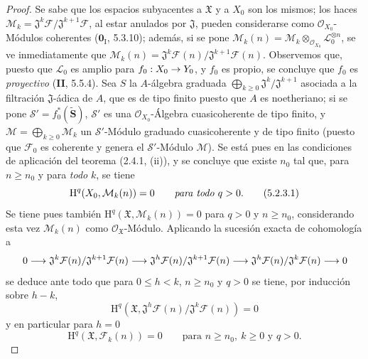 \documentclass[10pt,oneside,openany]{book}
\theoremstyle{egaenv}\newtheorem*{env}{---}
\theoremstyle{egastatement}
\theoremstyle{egadescription}
\newcommand{\oldpage}[2][]{\marginnote{\normalfont\scriptsize\textbf{#1}\,|\,#2}\ignorespaces}
\renewcommand{\leq}{\leqslant}
\renewcommand{\geq}{\geqslant}
\renewcommand{\to}{\mathchoice{\longrightarrow}{\rightarrow}{\rightarrow}{\rightarrow}}
\begin{document}
\begin{proof}
Se sabe que los espacios subyacentes a $\mathfrak X$ y a $X_0$ son los mismos;
los haces
$\mathcal M_k=\mathfrak J^k\mathcal F/\mathfrak J^{k+1}\mathcal F$,
al estar anulados por $\mathfrak J$, pueden considerarse como
$\mathcal O_{X_0}$-Módulos coherentes ($\mathbf{0}_{\mathrm I}$, 5.3.10); además, si se
pone $\mathcal M_k(n)=\mathcal M_k\otimes_{\mathcal O_{X_0}}
\mathcal L_0^{\otimes n}$, se ve inmediatamente que
$\mathcal M_k(n)=\mathfrak J^k\mathcal F(n)/
\mathfrak J^{k+1}\mathcal F(n)$.
Observemos que, puesto que $\mathcal L_0$ es amplio para $f_0:X_0\to Y_0$, y
\oldpage[III]{152}
$f_0$ es propio, se concluye que $f_0$ es \emph{proyectivo} (\textbf{II}, 5.5.4). Sea $S$ la $A$-álgebra
graduada $\bigoplus_{k\geq0}\mathfrak J^k/\mathfrak J^{k+1}$ asociada a la filtración $\mathfrak J$-ádica de $A$, que es
de tipo finito puesto que $A$ es noetheriano; si se pone
$\mathcal S'=f_0^*(\widetilde{\mathbf S})$,
$\mathcal S'$ es una
$\mathcal O_{X_0}$-Álgebra cuasicoherente de tipo finito, y
$\mathcal M=\bigoplus_{k\geq0}\mathcal M_k$ un
$\mathcal S'$-Módulo graduado cuasicoherente y de tipo finito (puesto que $\mathcal F_0$
es coherente y genera el $\mathcal S'$-Módulo $\mathcal M$). Se está pues en las
condiciones de aplicación del teorema (2.4.1, (ii)), y se concluye que existe
$n_0$ tal que, para $n\geq n_0$ y para \emph{todo} $k$, se tiene
\begin{equation}
\mathrm H^q(X_0,\mathcal M_k(n))=0\qquad\text{\emph{para todo} }q>0.
\tag{5.2.3.1}
\label{III.5.2.3.1-fr}
\end{equation}
Se tiene pues también $\mathrm H^q(\mathfrak X,\mathcal M_k(n))=0$ para $q>0$ y
$n\geq n_0$, considerando esta vez $\mathcal M_k(n)$ como
$\mathcal O_{\mathfrak X}$-Módulo. Aplicando la sucesión exacta de cohomología a
\[
0\to
\mathfrak J^k\mathcal F(n)/\mathfrak J^{k+1}\mathcal F(n)
\to
\mathfrak J^h\mathcal F(n)/\mathfrak J^{k+1}\mathcal F(n)
\to
\mathfrak J^h\mathcal F(n)/\mathfrak J^k\mathcal F(n)
\to0
\]
se deduce ante todo que para $0\leq h<k$, $n\geq n_0$ y $q>0$ se tiene, por
inducción sobre $h-k$,
\begin{equation}
\mathrm H^q(\mathfrak X,
\mathfrak J^h\mathcal F(n)/\mathfrak J^k\mathcal F(n))=0
\tag{5.2.3.2}
\label{III.5.2.3.2-fr}
\end{equation}
y en particular para $h=0$
\begin{equation}
\mathrm H^q(\mathfrak X,\mathcal F_k(n))=0
\qquad\text{para }n\geq n_0,\ k\geq0\text{ y }q>0.
\tag{5.2.3.3}
\label{III.5.2.3.3-fr}
\end{equation}

\end{proof}
\end{document}
